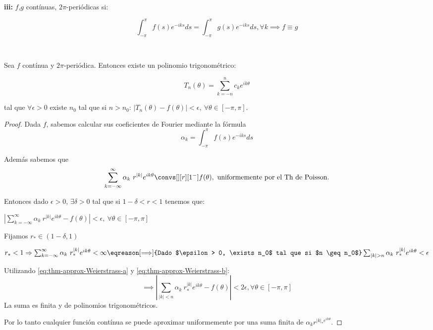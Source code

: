 		\textbf{iii:} $f$,$g$ contínuas, $2\pi$-periódicas si:

		\[ \int_{-\pi}^{\pi} f(s) e^{-iks}ds =
		 \int_{-\pi}^{\pi} g(s) e^{-iks}ds,  \forall k \implies f \equiv g \]

		\begin{theorem} \label{thm:AproxWeierstrass1}
		$ $ %

		Sea $f$ contínua y $2\pi$-periódica. Entonces existe un polinomio trigonométrico:

		\[T_n (\theta) = \sum_{k = -n}^n c_k e^{ik\theta} \]

		tal que $\forall \epsilon > 0$ existe $n_0$ tal que si $n > n_0$: $|T_n (\theta) - f(\theta)| < \epsilon, \ \forall \theta \in [-\pi,\pi]$.
		\end{theorem}

		\begin{proof}
			Dada $f$, sabemos calcular sus coeficientes de Fourier mediante la fórmula
			\[ \alpha_k = \int_{-\pi}^\pi f(s) e^{-iks} ds \]

			Además sabemos que
			\[ \sum_{k=-\infty}^{\infty} \alpha_k\  r^{|k|} e^{ik\theta} \convs[][r][1^-] f(\theta), \text{ uniformemente por el Th de Poisson.} \]

			Entonces dado $\epsilon > 0$, $\exists \delta > 0$ tal que si $1-\delta < r < 1$ tenemos que:

			\( \left| \sum_{k=-\infty}^{\infty} \alpha_k\  r^{|k|} e^{ik\theta} - f(\theta) \right| < \epsilon, \ \forall \theta \in [-\pi,\pi]  \label{eq:thm-approx-Weierstrass-a} \)

			Fijamos $r_{*} \in (1-\delta, 1)$

			\( r_* < 1 \Rightarrow \sum_{k=-\infty}^\infty \alpha_k\  r_*^{|k|} e^{ik\theta} < \infty \eqreason[\Longrightarrow]{Dado $\epsilon > 0, \exists n_0$ tal que si $n \geq n_0$} \sum_{|k| > n} \alpha_k\  r_*^{|k|} e^{ik\theta} < \epsilon \label{eq:thm-approx-Weierstrass-b} \)

			Utilizando \ref{eq:thm-approx-Weierstrass-a} y \ref{eq:thm-approx-Weierstrass-b}:
			\[ \implies \left| \sum_{|k| < n} \alpha_k\  r_*^{|k|} e^{ik\theta} - f(\theta) \right| < 2 \epsilon, \forall \theta \in [-\pi,\pi] \]
			\obs La suma es finita y de polinomios trigonométricos.

			Por lo tanto cualquier función contínua se puede aproximar uniformemente por una suma finita de $\alpha_k r^{|k|_* e^{ik\theta}}$.

		\end{proof}

